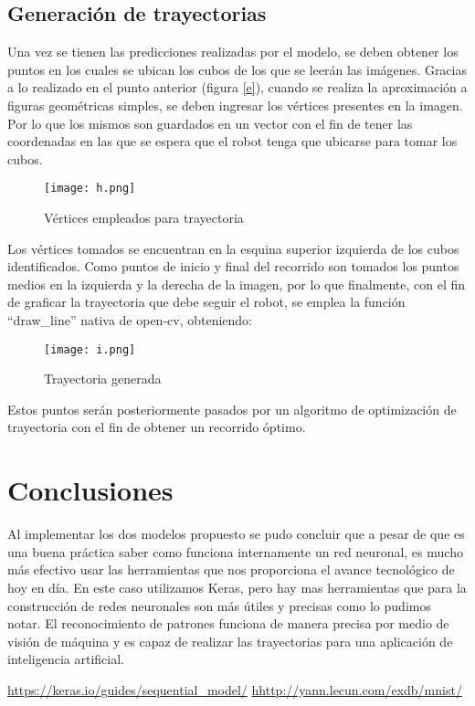 \documentclass[journal]{IEEEtran}
\begin{document}
\subsection{Generación de trayectorias}
Una vez se tienen las predicciones realizadas por el modelo, se deben obtener los puntos en los cuales se ubican los cubos de los que se leerán las imágenes. Gracias a lo realizado en el punto anterior (figura \ref{e}), cuando se realiza la aproximación a figuras geométricas simples, se deben ingresar los vértices presentes en la imagen. Por lo que los mismos son guardados en un vector con el fin de tener las coordenadas en las que se espera que el robot tenga que ubicarse para tomar los cubos. \\
 \begin{figure} [H]
    \centering
    \texttt{[image: h.png]}
    \caption{Vértices empleados para trayectoria}
    \label{h}
\end{figure}
Los vértices tomados se encuentran en la esquina superior izquierda de los cubos identificados. Como puntos de inicio y final del recorrido son tomados los puntos medios en la izquierda y la derecha de la imagen, por lo que finalmente, con el fin de graficar la trayectoria que debe seguir el robot, se emplea la función “draw\_line” nativa de open-cv, obteniendo:\\
 \begin{figure} [H]
    \centering
    \texttt{[image: i.png]}
    \caption{Trayectoria generada}
    \label{i}
\end{figure}
Estos puntos serán posteriormente pasados por un algoritmo de optimización de trayectoria con el fin de obtener un recorrido óptimo.


\section{Conclusiones}
Al implementar los dos modelos propuesto se pudo concluir que a pesar de que es una buena práctica saber como funciona internamente un red neuronal, es mucho más efectivo usar las herramientas que nos proporciona el avance tecnológico de hoy en día. En este caso utilizamos Keras, pero hay mas herramientas que para la construcción de redes neuronales son más útiles y precisas como lo pudimos notar. El reconocimiento de patrones funciona de manera precisa por medio de visión de máquina y es capaz de realizar las trayectorias para una aplicación de inteligencia artificial.

\ifCLASSOPTIONcaptionsoff
  \newpage
\fi


\begin{thebibliography}{1}

\url{https://keras.io/guides/sequential_model/}
\url{hhttp://yann.lecun.com/exdb/mnist/}


\end{thebibliography}
\end{document}
